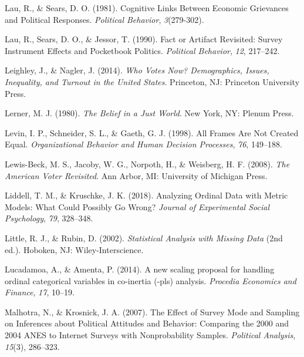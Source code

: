 \documentclass[12pt,econ]{sources/authesis}
\begin{document}
\leavevmode\hypertarget{ref-lau_cognitive_1981}{}%
Lau, R., \& Sears, D. O. (1981). Cognitive Links Between Economic Grievances and Political Responses. \emph{Political Behavior}, \emph{3}(279-302).

\leavevmode\hypertarget{ref-lau_fact_1990}{}%
Lau, R., Sears, D. O., \& Jessor, T. (1990). Fact or Artifact Revisited: Survey Instrument Effects and Pocketbook Politics. \emph{Political Behavior}, \emph{12}, 217--242.

\leavevmode\hypertarget{ref-leighley_who_2014}{}%
Leighley, J., \& Nagler, J. (2014). \emph{Who Votes Now? Demographics, Issues, Inequality, and Turnout in the United States}. Princeton, NJ: Princeton University Press.

\leavevmode\hypertarget{ref-lerner_belief_1980}{}%
Lerner, M. J. (1980). \emph{The Belief in a Just World}. New York, NY: Plenum Press.

\leavevmode\hypertarget{ref-levin_1998_frames}{}%
Levin, I. P., Schneider, S. L., \& Gaeth, G. J. (1998). All Frames Are Not Created Equal. \emph{Organizational Behavior and Human Decision Processes}, \emph{76}, 149--188.

\leavevmode\hypertarget{ref-lewis-beck_2008_american}{}%
Lewis-Beck, M. S., Jacoby, W. G., Norpoth, H., \& Weisberg, H. F. (2008). \emph{The American Voter Revisited}. Ann Arbor, MI: University of Michigan Press.

\leavevmode\hypertarget{ref-liddell_2018_analyzing}{}%
Liddell, T. M., \& Kruschke, J. K. (2018). Analyzing Ordinal Data with Metric Models: What Could Possibly Go Wrong? \emph{Journal of Experimental Social Psychology}, \emph{79}, 328--348.

\leavevmode\hypertarget{ref-little_2002_statistical}{}%
Little, R. J., \& Rubin, D. (2002). \emph{Statistical Analysis with Missing Data} (2nd ed.). Hoboken, NJ: Wiley-Interscience.

\leavevmode\hypertarget{ref-lucadamoa_2014_scaling}{}%
Lucadamoa, A., \& Amenta, P. (2014). A new scaling proposal for handling ordinal categorical variables in co-inertia (-pls) analysis. \emph{Procedia Economics and Finance}, \emph{17}, 10--19.

\leavevmode\hypertarget{ref-malhotra_2007_effect}{}%
Malhotra, N., \& Krosnick, J. A. (2007). The Effect of Survey Mode and Sampling on Inferences about Political Attitudes and Behavior: Comparing the 2000 and 2004 ANES to Internet Surveys with Nonprobability Samples. \emph{Political Analysis}, \emph{15}(3), 286--323.
\end{document}
